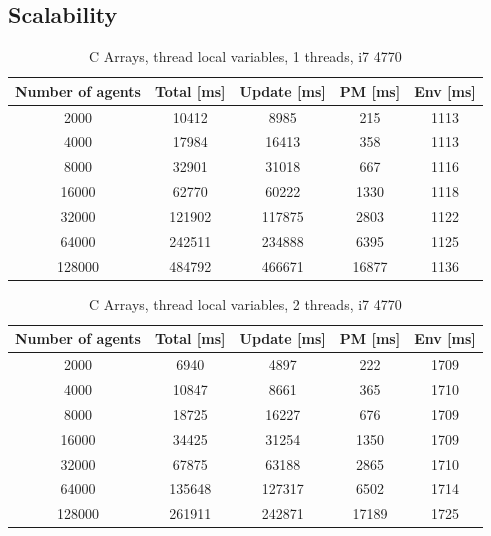 \documentclass[12pt, a4paper]{report}
\begin{document}
\begin{appendices}
\subsection{Scalability}\label{appen-subsec:bench-array-multi}
\begin{table}[H]
  \begin{center}
    \begin{tabular}{|c||c||c|c|c|}
    \hline
    Number of agents & Total [ms] & Update [ms] & PM [ms] & Env [ms] \\ \hline
    2000             & 10412      & 8985        & 215     & 1113     \\
    4000             & 17984      & 16413       & 358     & 1113     \\
    8000             & 32901      & 31018       & 667     & 1116     \\
    16000            & 62770      & 60222       & 1330    & 1118     \\
    32000            & 121902     & 117875      & 2803    & 1122     \\
    64000            & 242511     & 234888      & 6395    & 1125     \\
    128000           & 484792     & 466671      & 16877   & 1136     \\ \hline
     \end{tabular}
    \caption {C Arrays, thread local variables, 1 threads, i7 4770}
    \label{table:append-c-arrays-1-thread-line}
  \end{center}
\end{table}

\begin{table}[H]
  \begin{center}
    \begin{tabular}{|c||c||c|c|c|}
    \hline
    Number of agents & Total [ms] & Update [ms] & PM [ms] & Env [ms] \\ \hline
    2000             & 6940       & 4897        & 222     & 1709     \\
    4000             & 10847      & 8661        & 365     & 1710     \\
    8000             & 18725      & 16227       & 676     & 1709     \\
    16000            & 34425      & 31254       & 1350    & 1709     \\
    32000            & 67875      & 63188       & 2865    & 1710     \\
    64000            & 135648     & 127317      & 6502    & 1714     \\
    128000           & 261911     & 242871      & 17189   & 1725     \\ \hline
     \end{tabular}
    \caption {C Arrays, thread local variables, 2 threads, i7 4770}
    \label{table:append-c-arrays-2-thread-line}
  \end{center}
\end{table}


\end{appendices}
\end{document}

